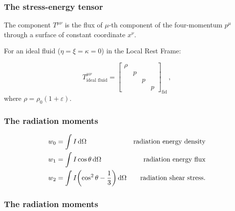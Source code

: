 \documentclass{beamer}
\begin{document}
\begin{frame}
    \frametitle{The stress-energy tensor}

    The component \(T^{\mu\nu}\) is the flux of \(\mu\)-th component of the four-momentum \(p^\mu\) through a surface of constant coordinate \(x^\nu\).

    For an ideal fluid (\(\eta = \xi = \kappa = 0\)) in the Local Rest Frame:

    \begin{equation*}
        T^{\mu\nu}_{\text{ideal fluid}} =
        \begin{bmatrix}
        \rho   &   &   &  \\
           & p  &   &  \\
           &   & p  &  \\
           &   &   & p
       \end{bmatrix}_{\text{fid}} \,,
    \end{equation*}
    where \(\rho = \rho_0 (1 + \varepsilon)\).
\end{frame}

\begin{frame}
    \frametitle{The radiation moments}

    \begin{subequations}
    \begin{align*}
      w_0 &= \int I \dd{\Omega} & \text{radiation energy density} \\
      w_1 &= \int I \cos \theta \dd{\Omega} & \text{radiation energy flux} \\
      w_2 &= \int I \qty(\cos^2 \theta - \frac{1}{3}) \dd{\Omega} & \text{radiation shear stress.}
    \end{align*}
    \end{subequations}
\end{frame}

\begin{frame}
    \frametitle{The radiation moments}

\end{frame}
\end{document}
